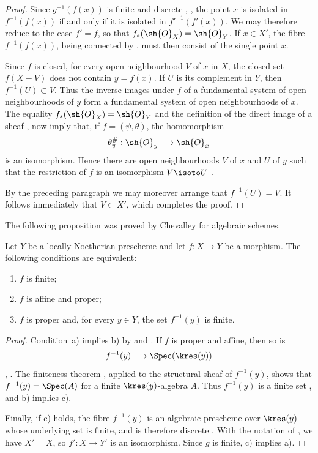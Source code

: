 \begin{proof}
Since $g^{-1}(f(x))$ is finite and discrete
, , the point $x$ is isolated in
$f^{-1}(f(x))$ if and only if it is isolated in
$f'^{-1}(f'(x))$.  We may therefore reduce to the case $f'=f$, so
that $f_*(\sh{O}_X)=\sh{O}_Y$.  If $x\in X'$, the fibre
$f^{-1}(f(x))$, being connected by , must then
consist of the single point $x$.

Since $f$ is closed, for every open neighbourhood $V$ of $x$ in
$X$, the closed set $f(X-V)$ does not contain $y=f(x)$.  If $U$ is
its complement in $Y$, then $f^{-1}(U)\subset V$.  Thus the inverse
images under $f$ of a fundamental system of open neighbourhoods of
$y$ form a fundamental system of open neighbourhoods of $x$.
The equality $f_*(\sh{O}_X)=\sh{O}_Y$ and the definition of the
direct image of a sheaf ,  now
imply that, if $f=(\psi,\theta)$, the homomorphism
\[
  \theta_y^\#:\sh{O}_y\longrightarrow\sh{O}_x
\]
is an isomorphism.  Hence there are open neighbourhoods $V$ of $x$
and $U$ of $y$ such that the restriction of $f$ is an isomorphism
$V\isoto U$ .


By the preceding paragraph we may moreover arrange that
$f^{-1}(U)=V$.  It follows immediately that $V\subset X'$, which
completes the proof.
\end{proof}

The following proposition was proved by Chevalley for algebraic
schemes.

\begin{proposition}[4.4.2]
\label{III.4.4.2}
Let $Y$ be a locally Noetherian prescheme and let $f:X\to Y$ be a
morphism.  The following conditions are equivalent:
\begin{enumerate}
  \item[{\rm a)}] $f$ is finite;
  \item[{\rm b)}] $f$ is affine and proper;
  \item[{\rm c)}] $f$ is proper and, for every $y\in Y$, the set
    $f^{-1}(y)$ is finite.
\end{enumerate}
\end{proposition}

\begin{proof}
Condition~a) implies b) by  and
.  If $f$ is proper and affine, then so is
\[
  f^{-1}(y)\longrightarrow\Spec(\kres(y))
\]
, .  The finiteness theorem
, applied to the structural sheaf of $f^{-1}(y)$,
shows that $f^{-1}(y)=\Spec(A)$ for a finite
$\kres(y)$-algebra $A$.  Thus $f^{-1}(y)$ is a finite set
, and b) implies c).

Finally, if c) holds, the fibre $f^{-1}(y)$ is an algebraic
prescheme over $\kres(y)$ whose underlying set is finite, and is
therefore discrete .  With the notation of
, we have $X'=X$, so
$f':X\to Y'$ is an isomorphism.  Since $g$ is finite, c) implies
a).
\end{proof}


